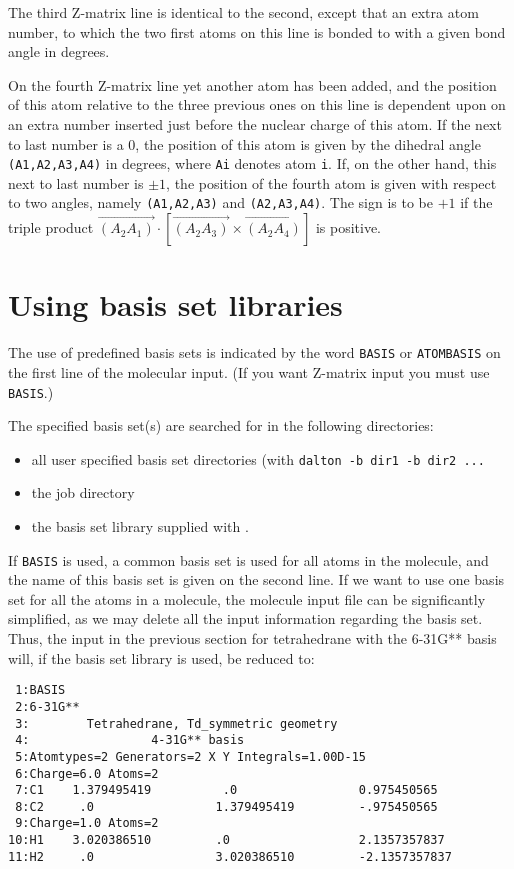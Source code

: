 The third Z-matrix line is identical to the second, except that an extra atom
number, to which the two first atoms on this line is bonded to with a
given bond angle in degrees.

On the fourth Z-matrix line yet another atom has been added, and the position
of this atom relative to the three previous ones on this line is
dependent upon on an extra number inserted just before the nuclear
charge of this atom. If the next to last number is a 0, the
position of this atom is given by the dihedral angle {\tt
(A1,A2,A3,A4)} in degrees, where {\tt Ai} denotes atom {\tt i}. If, on the other
hand, this next to last number is $\pm 1$, the position of the fourth
atom is given with respect to two angles, namely {\tt (A1,A2,A3)} and
{\tt (A2,A3,A4)}. The sign is to be $+ 1$ if the triple product
$\overrightarrow{\left(A_{2}A_{1}\right)}\cdot\left[\overrightarrow{\left(A_{2}A_{3}\right)}\times\overrightarrow{\left(A_{2}A_{4}\right)}\right]$
is positive.

\section{Using basis set libraries}\label{sec:molbasis}

The use of predefined basis sets is indicated
by the word {\tt BASIS} or {\tt ATOMBASIS} on the first line of the
molecular input.
(If you want Z-matrix input you must use {\tt BASIS}.)

The specified basis set(s) are searched for in the following directories:
\begin{itemize}
\item all user specified basis set directories (with {\tt dalton -b dir1 -b dir2 ...}
\item the job directory
\item the basis set library supplied with \dalton.
\end{itemize}

If {\tt BASIS} is used, a common basis set is used for all atoms in
the molecule, and the name of this basis set is given on the second line.
If we want to use one basis set for all the
atoms in a molecule, the molecule input file can be significantly
simplified, as we may delete all the input information regarding the
basis set. Thus, the input in the previous section for tetrahedrane
with the 6-31G** basis will, if the basis set library is used,  be reduced
to:

\begin{verbatim}
 1:BASIS
 2:6-31G**
 3:        Tetrahedrane, Td_symmetric geometry
 4:                 4-31G** basis
 5:Atomtypes=2 Generators=2 X Y Integrals=1.00D-15
 6:Charge=6.0 Atoms=2
 7:C1    1.379495419          .0                 0.975450565
 8:C2     .0                 1.379495419         -.975450565
 9:Charge=1.0 Atoms=2
10:H1    3.020386510         .0                  2.1357357837
11:H2     .0                 3.020386510         -2.1357357837
\end{verbatim}


